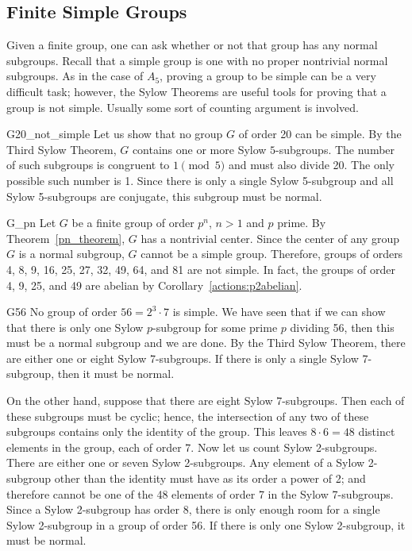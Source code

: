  
 
\subsection*{Finite Simple Groups}
 
 
Given a finite group, one can ask whether or not that group has any
normal subgroups. Recall that a simple group is one with no proper
nontrivial normal subgroups. As in the case of $A_5$, proving a group
to be simple can be a very difficult task; however, the Sylow Theorems
are useful tools for proving that a group is not simple. Usually
some sort of counting argument is involved.
 
 
\begin{example}{G20_not_simple}
Let us show that no group $G$ of order 20 can be simple.  By the Third
Sylow Theorem, $G$ contains one or more Sylow $5$-subgroups. The number
of such subgroups is congruent to $1 \pmod{5}$ and must also divide
20.  The only possible such number is 1.  Since there is only a
single Sylow 5-subgroup and all Sylow 5-subgroups are conjugate, this
subgroup must be normal. 
\end{example}
 
 
 
\begin{example}{G_pn}
Let $G$ be a finite group of order $p^n$, $n>1$ and $p$ prime.  By 
Theorem~\ref{pn_theorem}, $G$ has a nontrivial center. Since the center of any
group $G$ is a normal subgroup, $G$ cannot be a simple group.
Therefore, groups of orders 4, 8, 9, 16, 25, 27, 32, 49, 64, and 81
are not simple.  In fact, the groups of order 4, 9, 25, and 49 are 
abelian by Corollary~\ref{actions:p2abelian}.
\end{example}
 
 
 
\begin{example}{G56}
No group of order $56= 2^3 \cdot 7$ is simple.  We have seen that if
we can show that there is only one Sylow $p$-subgroup for some prime
$p$ dividing 56, then this must be a normal subgroup and we are done.
By the Third Sylow Theorem, there are either one or eight Sylow
7-subgroups.  If there is only a single Sylow 7-subgroup, then it must
be normal.  
 
 
On the other hand, suppose that there are eight Sylow 7-subgroups.
Then each of these subgroups must be cyclic; hence, the intersection
of any two of these subgroups contains only the identity of the group.
This leaves $8 \cdot 6 = 48$ distinct elements in the group, each of
order 7. Now let us count Sylow 2-subgroups. There are either one or
seven Sylow 2-subgroups.  Any element of a Sylow 2-subgroup other than
the identity must have as its order a  power of 2; and therefore
cannot be
one of the 48 elements of order 7 in the Sylow 7-subgroups. Since a
Sylow 2-subgroup has order 8, there is only enough room for a single
Sylow 2-subgroup in a group of order 56.  If there is only one Sylow
2-subgroup, it must be normal. 
\end{example}
 
